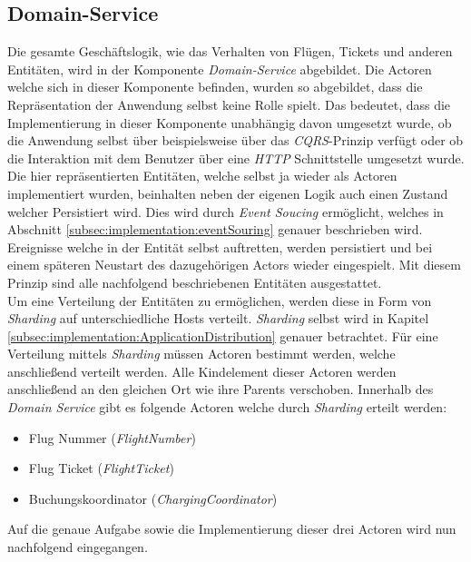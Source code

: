 \subsection{Domain-Service}
\label{subsec:implementation:domainService} 
Die gesamte Geschäftslogik, wie das Verhalten von Flügen, Tickets und anderen Entitäten, wird in der Komponente \textit{Domain-Service}  abgebildet. Die Actoren welche sich in dieser Komponente befinden, wurden so abgebildet, dass die Repräsentation der Anwendung selbst keine Rolle spielt. Das bedeutet, dass die Implementierung in dieser Komponente unabhängig davon umgesetzt wurde, ob die Anwendung selbst über beispielsweise über das \textit{CQRS}-Prinzip verfügt oder ob die Interaktion mit dem Benutzer über eine \textit{HTTP} Schnittstelle umgesetzt wurde. \\
Die hier repräsentierten Entitäten, welche selbst ja wieder als Actoren implementiert wurden, beinhalten neben der eigenen Logik auch einen Zustand welcher Persistiert wird. Dies wird durch \textit{Event Soucing} ermöglicht, welches in Abschnitt \ref{subsec:implementation:eventSouring} genauer beschrieben wird. Ereignisse welche in der Entität selbst auftretten, werden persistiert und bei einem späteren Neustart des dazugehörigen Actors wieder eingespielt. Mit diesem Prinzip sind alle nachfolgend beschriebenen Entitäten ausgestattet. \\
Um eine Verteilung der Entitäten zu ermöglichen, werden diese in Form von \textit{Sharding} auf unterschiedliche Hosts verteilt. \textit{Sharding} selbst wird in Kapitel \ref{subsec:implementation:ApplicationDistribution} genauer betrachtet. Für eine Verteilung mittels \textit{Sharding} müssen Actoren bestimmt werden, welche anschließend verteilt werden. Alle Kindelement dieser Actoren werden anschließend an den gleichen Ort wie ihre Parents verschoben. Innerhalb des \textit{Domain Service} gibt es folgende Actoren welche durch \textit{Sharding} erteilt werden:
\begin{itemize}
    \item Flug Nummer (\textit{FlightNumber})
    \item Flug Ticket (\textit{FlightTicket})
    \item Buchungskoordinator (\textit{ChargingCoordinator})
\end{itemize}
Auf die genaue Aufgabe sowie die Implementierung dieser drei Actoren wird nun nachfolgend eingegangen.


